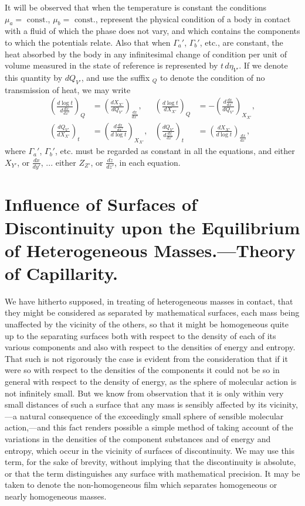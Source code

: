 \documentclass[12pt]{memoir}
\begin{document}
{It will be observed that when the temperature is constant the conditions  $\mu_a = \text{ const.}$, $\mu_b = \text{ const.}$, represent the physical condition of a body in contact with a fluid of which the phase does not vary, and which contains the components to which the potentials relate. Also that when $\Gamma_a'$, $\Gamma_b'$, etc., are constant, the heat absorbed by the body in any infinitesimal change of condition per unit of volume measured in the state of reference is represented by $t\,d\eta_{V'}$. If we denote this quantity by $dQ_{V'}$, and use the suffix $_Q$ to denote the condition of no transmission of heat, we may write
\begin{align}
\left( \frac{d \log t}{d\frac{dx}{dx'}}\right)_{Q} &= \left(\frac{dX_{X'}}{dQ_{V'}} \right)_{\frac{dx}{dx'}},     &
\left( \frac{d \log t}{dX_{X'}}\right)_{Q} &=  -\left(\frac{d\frac{dx}{dx'}}{dQ_{V'}} \right)_{X_{X'}},    \label{474} \\
\left( \frac{d Q_{V'}}{d X_{X'}}\right)_{t} &= \left(\frac{d\frac{dx}{dx'}}{d \log t} \right)_{X_{X'}},     &
\left( \frac{d Q_{V'}}{d \frac{dx}{dx'}}\right)_{t} &= \left(\frac{d X_{X'}}{d \log t} \right)_{\frac{dx}{dx'}},   \label{475}
\end{align}
where $\Gamma_a'$, $\Gamma_b'$, etc. must be regarded as constant in all the equations, and either $X_{Y'}$, or $\frac{dx}{dy'}$, ... either $Z_{Z'}$, or $\frac{dz}{dz'}$, in each equation.

\section{Influence of Surfaces of Discontinuity upon the Equilibrium of Heterogeneous Masses.---Theory of Capillarity.}

We have hitherto supposed, in treating of heterogeneous masses in contact, that they might be considered as separated by mathematical surfaces, each mass being unaffected by the vicinity of the others, so that it might be homogeneous quite up to the separating surfaces both with respect to the density of each of its various components and also with respect to the densities of energy and entropy. That such is not rigorously the case is evident from the consideration that if it were so with respect to the densities of the components it could not be so in general with respect to the density of energy, as the sphere of molecular action is not infinitely small. But we know from observation that it is only within very small distances of such a surface that any mass is sensibly affected by its vicinity,---a natural consequence of the exceedingly small sphere of sensible molecular action,---and this fact renders possible a simple method of taking account of the variations in the densities of the component substances and of energy and entropy, which occur in the vicinity of surfaces of discontinuity. We may use this term, for the sake of brevity, without implying that the discontinuity is absolute, or that the term distinguishes any surface with mathematical precision.  It may be taken to denote the non-homogeneous film which separates homogeneous or nearly homogeneous masses.


}
\end{document}
